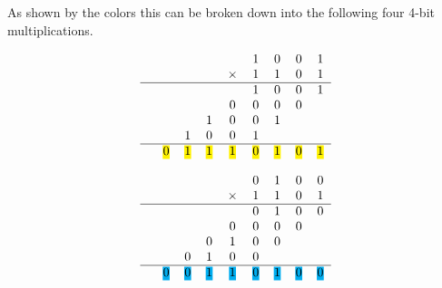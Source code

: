 \documentclass[11pt]{article}
\newcommand{\hlc}[2][yellow]{{%
    \colorlet{foo}{#1}%
    \sethlcolor{foo}\hl{#2}}%
}
\begin{document}
As shown by the colors this can be broken down into the following four 4-bit multiplications. 
\vspace{5mm}
\begin{minipage}{.5\linewidth}
    \begin{equation}
        \label{eq:yellow}
        \begin{tabular}{c c c c c c c c c }
            &   &   &   &   & 1 & 0 & 0 & 1 \\
            &   &   &   &  $\times$ & 1 & 1 & 0 & 1 \\
            \hline
            &   &   &   &   & 1 & 0 & 0 & 1 \\
            &   &   &   & 0 & 0 & 0 & 0 &   \\
            &   &   & 1 & 0 & 0 & 1 &   &   \\
            &   & 1 & 0 & 0 & 1 &   &   &   \\
            \hline
            & \hlc[yellow]{0} & \hlc[yellow]{1} & \hlc[yellow]{1} & \hlc[yellow]{1} & \hlc[yellow]{0} & \hlc[yellow]{1} & \hlc[yellow]{0} & \hlc[yellow]{1} \\
        \end{tabular} 
    \end{equation}
    \end{minipage}%
    \begin{minipage}{.5\linewidth}
        \begin{equation}
            \label{eq:blue}
            \begin{tabular}{c c c c c c c c c }
                &   &   &   &   & 0 & 1 & 0 & 0 \\
                &   &   &   &  $\times$ & 1 & 1 & 0 & 1 \\
                \hline
                &   &   &   &   & 0 & 1 & 0 & 0 \\
                &   &   &   & 0 & 0 & 0 & 0 &   \\
                &   &   & 0 & 1 & 0 & 0 &   &   \\
                &   & 0 & 1 & 0 & 0 &   &   &   \\
                \hline
                & \hlc[cyan]{0} & \hlc[cyan]{0} & \hlc[cyan]{1} & \hlc[cyan]{1} & \hlc[cyan]{0} & \hlc[cyan]{1} & \hlc[cyan]{0} & \hlc[cyan]{0} \\
            \end{tabular} 
        \end{equation}
\end{minipage}
\vspace{5mm}
\end{document}
